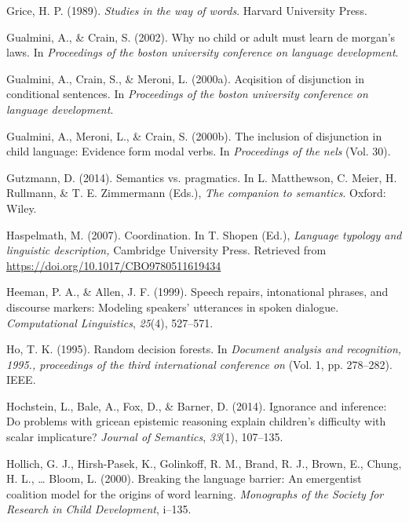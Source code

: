 \documentclass[oneside]{report}
\theoremstyle{definition}
\theoremstyle{definition}
\theoremstyle{definition}
\theoremstyle{remark}
\begin{document}
\hypertarget{ref-grice1989studies}{}
Grice, H. P. (1989). \emph{Studies in the way of words}. Harvard
University Press.

\hypertarget{ref-gualminicrain2002}{}
Gualmini, A., \& Crain, S. (2002). Why no child or adult must learn de
morgan's laws. In \emph{Proceedings of the boston university conference
on language development}.

\hypertarget{ref-gualmini2000}{}
Gualmini, A., Crain, S., \& Meroni, L. (2000a). Acqisition of
disjunction in conditional sentences. In \emph{Proceedings of the boston
university conference on language development}.

\hypertarget{ref-gualmini2000inclusion}{}
Gualmini, A., Meroni, L., \& Crain, S. (2000b). The inclusion of
disjunction in child language: Evidence form modal verbs. In
\emph{Proceedings of the nels} (Vol. 30).

\hypertarget{ref-gutzmann2014}{}
Gutzmann, D. (2014). Semantics vs. pragmatics. In L. Matthewson, C.
Meier, H. Rullmann, \& T. E. Zimmermann (Eds.), \emph{The companion to
semantics}. Oxford: Wiley.

\hypertarget{ref-haspelmath2007}{}
Haspelmath, M. (2007). Coordination. In T. Shopen (Ed.), \emph{Language
typology and linguistic description,} Cambridge University Press.
Retrieved from \url{https://doi.org/10.1017/CBO9780511619434}

\hypertarget{ref-heeman1999speech}{}
Heeman, P. A., \& Allen, J. F. (1999). Speech repairs, intonational
phrases, and discourse markers: Modeling speakers' utterances in spoken
dialogue. \emph{Computational Linguistics}, \emph{25}(4), 527--571.

\hypertarget{ref-ho1995random}{}
Ho, T. K. (1995). Random decision forests. In \emph{Document analysis
and recognition, 1995., proceedings of the third international
conference on} (Vol. 1, pp. 278--282). IEEE.

\hypertarget{ref-hochstein2014ignorance}{}
Hochstein, L., Bale, A., Fox, D., \& Barner, D. (2014). Ignorance and
inference: Do problems with gricean epistemic reasoning explain
children's difficulty with scalar implicature? \emph{Journal of
Semantics}, \emph{33}(1), 107--135.

\hypertarget{ref-hollich2000breaking}{}
Hollich, G. J., Hirsh-Pasek, K., Golinkoff, R. M., Brand, R. J., Brown,
E., Chung, H. L., \ldots{} Bloom, L. (2000). Breaking the language
barrier: An emergentist coalition model for the origins of word
learning. \emph{Monographs of the Society for Research in Child
Development}, i--135.
\end{document}
